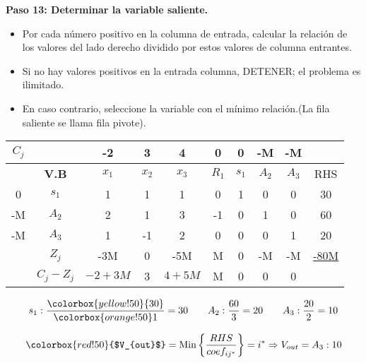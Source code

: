 \documentclass{templateNote}
\begin{document}
\textbf{Paso 13: Determinar la variable saliente.}
\begin{itemize}
    \item Por cada número positivo en la columna de entrada, calcular la relación de los valores del lado derecho dividido por estos valores de columna entrantes.
    \item Si no hay valores positivos en la entrada columna, DETENER; el problema es ilimitado.
    \item En caso contrario, seleccione la variable con el mínimo relación.(La fila saliente se llama fila pivote).
\end{itemize}
\begin{center}
    \begin{tabular}{|c|c|c|c|c|c|c|c|c|c|}
        \hline
        $C_j$ & & -2 & 3 & 4 & 0 & 0 & -M & -M & \\ \hline
        & \textbf{V.B} & $x_1$ & $x_2$ & $x_3$ & $R_1$ & $s_1$ & $A_2$ & $A_3$ & RHS \\ \hline
        0 & $s_1$ & 1 & 1 & \cellcolor{orange!50}1 & 0 & 1 & 0 & 0 & \cellcolor{yellow!50}30 \\ \hline
        -M & $A_2$ & 2 & 1 & 3 & -1 & 0 & 1 & 0 & 60 \\ \hline
        -M & $A_3$ & 1 & -1 & 2 & 0 & 0 & 0 & 1 & 20 \\ \hline
        & $Z_j$ & -3M & 0 & -5M & M & 0 & -M & -M & \underline{-80M} \\ \hline
        & $C_j - Z_j$ & $-2+3M$ & 3 & $4+5M$ & M & 0 & 0 & 0 & \\ \hline
    \end{tabular}
\end{center}
\begin{align*}
    s_1: \frac{\colorbox{yellow!50}{30}}{\colorbox{orange!50}1} = 30 \qquad A_2: \frac{60}{3} = 20 \qquad A_3: \frac{20}{2} = 10
\end{align*}
\begin{center}
    \begin{equation*}
        \colorbox{red!50}{$V_{out}$} = \text{Min} \left\{ \frac{RHS}{coef_{ij^*}} \right\} = i^* \Rightarrow V_{out} = A_3 : 10
    \end{equation*}
\end{center}
\end{document}
